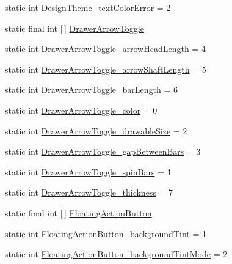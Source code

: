 \begin{DoxyCompactItemize}
\item 
static int \hyperlink{classandroid_1_1support_1_1v7_1_1appcompat_1_1R_1_1styleable_adc51f4b1386970d13ffffdb5a983b662}{Design\+Theme\+\_\+text\+Color\+Error} = 2
\item 
static final int \mbox{[}$\,$\mbox{]} \hyperlink{classandroid_1_1support_1_1v7_1_1appcompat_1_1R_1_1styleable_a7bd3ecc07eb763b454c40c0871959a35}{Drawer\+Arrow\+Toggle}
\item 
static int \hyperlink{classandroid_1_1support_1_1v7_1_1appcompat_1_1R_1_1styleable_a2761ca55152ffa3a51ad7b8eeae1c67d}{Drawer\+Arrow\+Toggle\+\_\+arrow\+Head\+Length} = 4
\item 
static int \hyperlink{classandroid_1_1support_1_1v7_1_1appcompat_1_1R_1_1styleable_a4b7bc95a81f9491de6faf46ff4f673b2}{Drawer\+Arrow\+Toggle\+\_\+arrow\+Shaft\+Length} = 5
\item 
static int \hyperlink{classandroid_1_1support_1_1v7_1_1appcompat_1_1R_1_1styleable_ae8ef18fa510292b2f8b05f36c70631bb}{Drawer\+Arrow\+Toggle\+\_\+bar\+Length} = 6
\item 
static int \hyperlink{classandroid_1_1support_1_1v7_1_1appcompat_1_1R_1_1styleable_a9cc1908fc44ebedfcf125c65a0ff5e0b}{Drawer\+Arrow\+Toggle\+\_\+color} = 0
\item 
static int \hyperlink{classandroid_1_1support_1_1v7_1_1appcompat_1_1R_1_1styleable_a579e9b0e2747d0ee8099120f0755be5e}{Drawer\+Arrow\+Toggle\+\_\+drawable\+Size} = 2
\item 
static int \hyperlink{classandroid_1_1support_1_1v7_1_1appcompat_1_1R_1_1styleable_a737c92b3ede20bdc07b042896c38c3c2}{Drawer\+Arrow\+Toggle\+\_\+gap\+Between\+Bars} = 3
\item 
static int \hyperlink{classandroid_1_1support_1_1v7_1_1appcompat_1_1R_1_1styleable_a22785cf0da7609e82faa84d7f2aa2f93}{Drawer\+Arrow\+Toggle\+\_\+spin\+Bars} = 1
\item 
static int \hyperlink{classandroid_1_1support_1_1v7_1_1appcompat_1_1R_1_1styleable_af9c043f5d15f590d94caaa0afa21c0dd}{Drawer\+Arrow\+Toggle\+\_\+thickness} = 7
\item 
static final int \mbox{[}$\,$\mbox{]} \hyperlink{classandroid_1_1support_1_1v7_1_1appcompat_1_1R_1_1styleable_a9bfca89352160169125a89277e9fb2a1}{Floating\+Action\+Button}
\item 
static int \hyperlink{classandroid_1_1support_1_1v7_1_1appcompat_1_1R_1_1styleable_a59bc6ada4a0ec9c433ebf84217630493}{Floating\+Action\+Button\+\_\+background\+Tint} = 1
\item 
static int \hyperlink{classandroid_1_1support_1_1v7_1_1appcompat_1_1R_1_1styleable_ab01d5ebdb493f8bb1f9595ee05409bfb}{Floating\+Action\+Button\+\_\+background\+Tint\+Mode} = 2

\end{DoxyCompactItemize}

